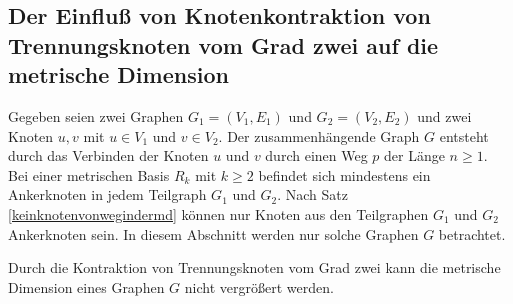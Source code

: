 \subsection{Der Einfluß von Knotenkontraktion von Trennungsknoten vom Grad zwei auf die metrische Dimension}
Gegeben seien zwei Graphen $G_1=(V_1,E_1)$ und $G_2=(V_2,E_2)$ und zwei Knoten $u,v$ mit $u \in V_1$ und $v\in V_2$.
Der zusammenhängende Graph $G$ entsteht durch das Verbinden der Knoten $u$ und $v$ durch einen Weg $p$ der Länge $n \geq 1$. Bei einer metrischen Basis $R_k$ mit $k \geq 2$ befindet sich mindestens ein Ankerknoten in jedem Teilgraph $G_1$ und $G_2$. Nach Satz \ref{keinknotenvonwegindermd} können nur Knoten aus den Teilgraphen $G_1$ und $G_2$ Ankerknoten sein. In diesem Abschnitt werden nur solche Graphen $G$ betrachtet.
\begin{lem}
\label{lem2}
\label{sepvertex}
Durch die Kontraktion von Trennungsknoten vom Grad zwei kann die metrische Dimension eines Graphen $G$ nicht vergrößert werden.
\end{lem}
